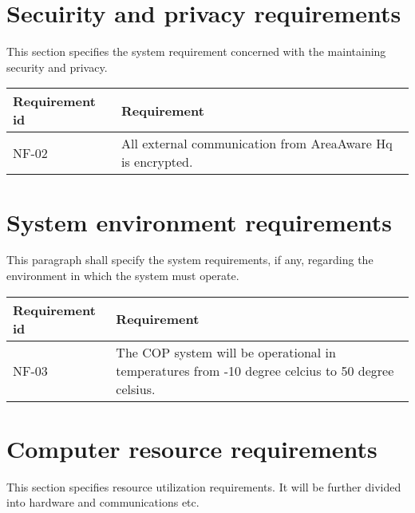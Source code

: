 

\section{Secuirity and privacy requirements}
This section specifies the system requirement concerned with the maintaining security and privacy.

\begin{longtable}{| p{3.2cm} |  p{10cm} | }
	\hline
	\textbf{Requirement id} &  \textbf{Requirement } \\
	\hline
	NF-02 &All external communication from AreaAware Hq is encrypted.  \\
	\hline
\end{longtable}

\section{System environment requirements}
This paragraph shall specify the system requirements, if any, regarding the environment in which the system must operate.

\begin{longtable}{| p{3.2cm} |  p{10cm} | }
	\hline
	\textbf{Requirement id} &  \textbf{Requirement } \\
	\hline
	NF-03 & The COP system will be operational in temperatures from -10 degree celcius to 50 degree celsius.  \\
	\hline
\end{longtable}

\section{Computer resource requirements}
This section specifies resource utilization requirements. It will be further divided into hardware and communications etc.

